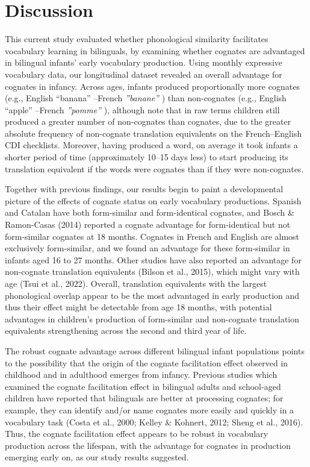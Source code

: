 \documentclass[
  ,man,floatsintext]{apa6}
\begin{document}
\hypertarget{discussion}{%
\section{Discussion}\label{discussion}}

This current study evaluated whether phonological similarity facilitates vocabulary learning in bilinguals, by examining whether cognates are advantaged in bilingual infants' early vocabulary production. Using monthly expressive vocabulary data, our longitudinal dataset revealed an overall advantage for cognates in infancy. Across ages, infants produced proportionally more cognates (e.g., English ``banana'' --French \emph{''banane''} ) than non-cognates (e.g., English ``apple'' --French \emph{''pomme''} ), although note that in raw terms children still produced a greater number of non-cognates than cognates, due to the greater absolute frequency of non-cognate translation equivalents on the French--English CDI checklists. Moreover, having produced a word, on average it took infants a shorter period of time (approximately 10--15 days less) to start producing its translation equivalent if the words were cognates than if they were non-cognates.

Together with previous findings, our results begin to paint a developmental picture of the effects of cognate status on early vocabulary productions. Spanish and Catalan have both form-similar and form-identical cognates, and Bosch \& Ramon-Casas (2014) reported a cognate advantage for form-identical but not form-similar cognates at 18 months. Cognates in French and English are almost exclusively form-similar, and we found an advantage for these form-similar in infants aged 16 to 27 months. Other studies have also reported an advantage for non-cognate translation equivalents (Bilson et al., 2015), which might vary with age (Tsui et al., 2022). Overall, translation equivalents with the largest phonological overlap appear to be the most advantaged in early production and thus their effect might be detectable from age 18 months, with potential advantages in children's production of form-similar and non-cognate translation equivalents strengthening across the second and third year of life.

The robust cognate advantage across different bilingual infant populations points to the possibility that the origin of the cognate facilitation effect observed in childhood and in adulthood emerges from infancy. Previous studies which examined the cognate facilitation effect in bilingual adults and school-aged children have reported that bilinguals are better at processing cognates; for example, they can identify and/or name cognates more easily and quickly in a vocabulary task (Costa et al., 2000; Kelley \& Kohnert, 2012; Sheng et al., 2016). Thus, the cognate facilitation effect appears to be robust in vocabulary production across the lifespan, with the advantage for cognates in production emerging early on, as our study results suggested.
\end{document}
